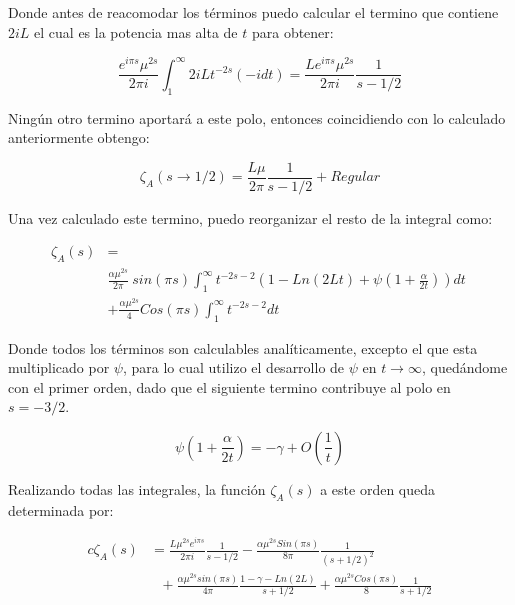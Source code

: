 Donde antes de reacomodar los términos puedo calcular el termino que contiene $2iL$ el cual es la potencia mas alta de $t$ para obtener: 

\begin{equation}
    \frac{e^{i \pi s} \mu ^{2s} }{2 \pi i }
    \int _1 ^{\infty}
    2 i L    
    t ^{-2 s}
    (-i dt) =  
    \frac{L e^{i \pi s} \mu ^{2s}}{2 \pi i} \frac{1}{s-1/2   }
\end{equation}

Ningún otro termino aportará a este polo, entonces coincidiendo con lo calculado anteriormente obtengo:

\begin{equation}
    \zeta _A  (s \rightarrow 1/2) = \frac{L \mu }{2 \pi} \frac{1}{s- 1/2 } + Regular
\end{equation}


Una vez calculado este termino, puedo reorganizar el resto de la integral como:

\begin{equation}
\begin{aligned}
	\zeta _A (s) &=  \\[5pt]
    & \frac{\alpha \mu ^{2s} }{2 \pi} \ sin(\pi s)
    \int _1 ^{\infty}
    t ^{-2 s-2} 
    \left(
    1 - Ln(2Lt) + \psi (1 + \frac{\alpha}{2t})
    \right) dt \  \\[5pt]
    & +
    \frac{\alpha \mu ^{2s} }{4} 
    Cos(\pi s)
    \int _1 ^{\infty} t^{-2s-2} dt
\end{aligned}
\end{equation}

Donde todos los términos son calculables analíticamente, excepto el que esta multiplicado por $\psi$, para lo cual utilizo el desarrollo de $\psi$ en $t \rightarrow \infty$, quedándome con el primer orden, dado que el siguiente termino contribuye al polo en $s = -3/2$.

\begin{equation}
    \psi(1 + \frac{\alpha}{2 t}) =
    - \gamma + O \left( \frac{1}{t} \right)
\end{equation}

Realizando todas las integrales, la función $ \zeta _A (s)$ a este orden queda determinada por:  

\begin{equation}
\begin{aligned}{c}
    \zeta _A (s)  &= 
    \frac{L \mu ^{2 s} e ^{i \pi s}}{2 \pi i} \frac{1}{s-1/2} 
    -\frac{\alpha \mu ^{2s} Sin(\pi s)}{8 \pi} \frac{1}{(s+1/2) ^2} \\
    & \ \ \ + \frac{\alpha \mu ^{2s} sin (\pi s) }{4 \pi } \frac{1 - \gamma -  Ln(2 L)}{s+1/2}
    + \frac{\alpha \mu ^{2s} Cos(\pi s)}{8} \frac{1}{s+1/2}
\end{aligned}
\end{equation}



